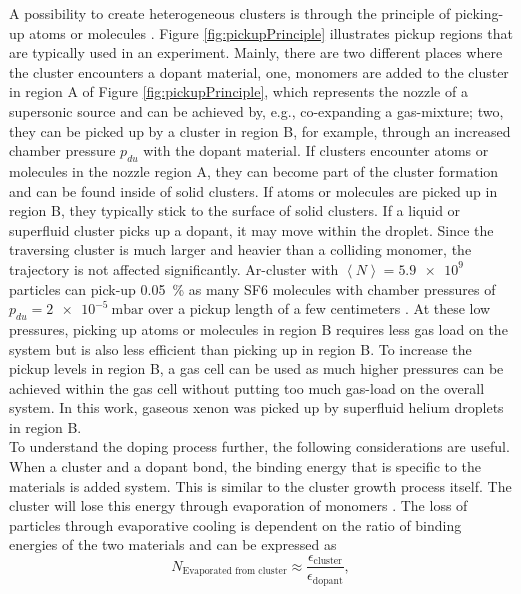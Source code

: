 A possibility to create heterogeneous clusters is through the principle of picking-up atoms or molecules \citep{Haberland-1994-Springer}. Figure \ref{fig:pickupPrinciple} illustrates pickup regions that are typically used in an experiment. Mainly, there are two different places where the cluster encounters a dopant material, one, monomers are added to the cluster in region A of Figure \ref{fig:pickupPrinciple}, which represents the nozzle of a supersonic source and can be achieved by, e.g., co-expanding a gas-mixture; two, they can be picked up by a cluster in region B, for example, through an increased chamber pressure $p_{du}$ with the dopant material. If clusters encounter atoms or molecules in the nozzle region A, they can become part of the cluster formation and can be found inside of solid clusters. If atoms or molecules are picked up in region B, they typically stick to the surface of solid clusters. If a liquid or superfluid cluster picks up a dopant, it may move within the droplet. Since the traversing cluster is much larger and heavier than a colliding monomer, the trajectory is not affected significantly. Ar-cluster with $\left\langle N\right\rangle = \num{5.9e9}$ particles can pick-up \SI{0.05}{\percent} as many SF6 molecules with chamber pressures of $p_{du}=\SI{2e-5}{\milli\bar}$ over a pickup length of a few centimeters \citep{Gough-1985-JChemPhys}. At these low pressures, picking up atoms or molecules in region B requires less gas load on the system but is also less efficient than picking up in region B. To increase the pickup levels in region B, a gas cell can be used as much higher pressures can be achieved within the gas cell without putting too much gas-load on the overall system. In this work, gaseous xenon was picked up by superfluid helium droplets in region B.\\[1\baselineskip]
%
To understand the doping process further, the following considerations are useful. When a cluster and a dopant bond, the binding energy that is specific to the materials is added system. This is similar to the cluster growth process itself. The cluster will lose this energy through evaporation of monomers \citep{Gomez-2011-JCP}. The loss of particles through evaporative cooling is dependent on the ratio of binding energies of the two materials and can be expressed as
\begin{equation}
N_{\text{Evaporated from cluster}} \approx \frac{\epsilon_{\text{cluster}}}{\epsilon_{\text{dopant}}},
\label{eq:evaporated-amount}
\end{equation}
